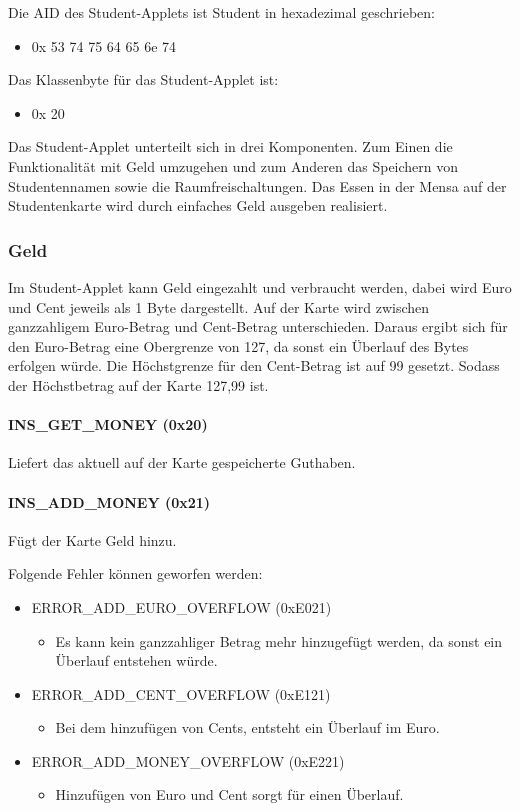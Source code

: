 Die AID des Student-Applets ist Student in hexadezimal geschrieben:
\begin{itemize}
	\item 0x 53 74 75 64 65 6e 74
\end{itemize}
Das Klassenbyte für das Student-Applet ist:
\begin{itemize}
	\item 0x 20
\end{itemize}

Das Student-Applet unterteilt sich in drei Komponenten.
Zum Einen die Funktionalität mit Geld umzugehen und zum Anderen das Speichern von Studentennamen sowie die Raumfreischaltungen.
Das Essen in der Mensa auf der Studentenkarte wird durch einfaches Geld ausgeben realisiert.

\subsubsection{Geld}
\label{label:geld}
Im Student-Applet kann Geld eingezahlt und verbraucht werden, dabei wird Euro und Cent jeweils als 1 Byte dargestellt.
Auf der Karte wird zwischen ganzzahligem Euro-Betrag und Cent-Betrag unterschieden.
Daraus ergibt sich für den Euro-Betrag eine Obergrenze von 127\texteuro{}, da sonst ein Überlauf des Bytes erfolgen würde.
Die Höchstgrenze für den Cent-Betrag ist auf 99\textcent{} gesetzt.
Sodass der Höchstbetrag auf der Karte 127,99\texteuro{} ist.

\paragraph{INS\_GET\_MONEY (0x20)}
Liefert das aktuell auf der Karte gespeicherte Guthaben.
\paragraph{INS\_ADD\_MONEY (0x21)}
Fügt der Karte Geld hinzu.

Folgende Fehler können geworfen werden:
\begin{itemize}
	\item ERROR\_ADD\_EURO\_OVERFLOW (0xE021)
	\begin{itemize}
		\item Es kann kein ganzzahliger Betrag mehr hinzugefügt werden, da sonst ein Überlauf entstehen würde.
	\end{itemize}
	\item ERROR\_ADD\_CENT\_OVERFLOW (0xE121)
	\begin{itemize}
		\item Bei dem hinzufügen von Cents, entsteht ein Überlauf im Euro. 
	\end{itemize}
	\item ERROR\_ADD\_MONEY\_OVERFLOW (0xE221)
	\begin{itemize}
		\item Hinzufügen von Euro und Cent sorgt für einen Überlauf.
	\end{itemize}
\end{itemize}

